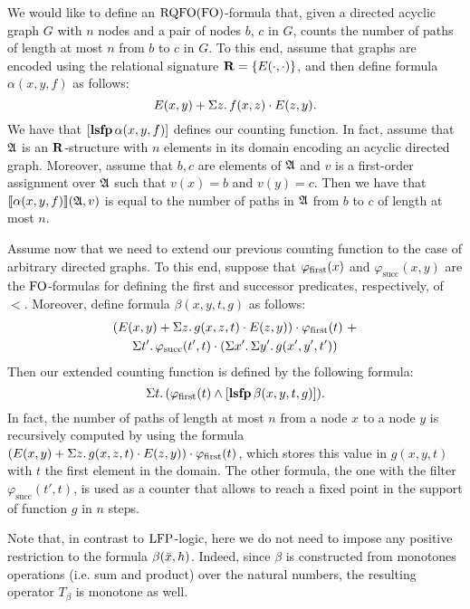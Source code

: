 \begin{example} \label{ex:count-path}
We would like to define an ${\rm RQFO}({\rm FO})$-formula that, given a directed acyclic graph $G$ with $n$ nodes and a pair of nodes $b$, $c$ in $G$, counts the number of paths of length at most $n$ from $b$ to $c$ in $G$. To this end, assume that graphs are encoded using the relational signature $\mathbf{R} = \{ E(\cdot,\cdot) \}$, and then define formula $\alpha(x, y, f)$ as follows:
$$
E(x,y) + \Sigma{z}.\, f(x,z)\cdot E(z,y).
$$
We have that $[{\bf lsfp} \, \alpha(x,y,f)]$ defines our counting function. In fact, assume that $\mathfrak{A}$ is an $\mathbf{R}$-structure with $n$ elements in its domain encoding an acyclic directed graph. Moreover, assume that $b,c$ are elements of $\mathfrak{A}$ and $v$ is a first-order assignment over $\mathfrak{A}$ such that $v(x) = b$ and $v(y) = c$. Then we have that ${\llbracket{}{\alpha(x,y,f)}\rrbracket}(\mathfrak{A},v)$ is equal to the  number of paths in $\mathfrak{A}$ from $b$ to $c$ of length at most $n$.

Assume now that we need to extend our previous counting function to the case of arbitrary directed graphs. To this end, suppose that $\varphi_{\text{\rm first}}(x)$ and $\varphi_{\text{succ}}(x,y)$ are the ${\rm FO}$-formulas for defining the first and successor predicates, respectively, of $<$. Moreover, define formula $\beta(x, y, t, g)$ as follows:
\begin{multline*}
(E(x,y) + \Sigma{z}.\, g(x,z,t)\cdot E(z,y)) \cdot \varphi_{\text{\rm first}}(t) \ +\\
\Sigma{t'}.\, \varphi_{\text{succ}}(t',t) \cdot \left(\Sigma{x'}.\, \Sigma{y'}.\, g(x',y',t') \right)
\end{multline*}
Then our extended counting function is defined by the following formula:
$$
\Sigma{t}.\, (\varphi_{\text{\rm first}}(t) \wedge [{\bf lsfp} \, \beta(x,y,t,g)]).
$$ 
In fact, the number of paths of length at most $n$ from a node $x$ to a node $y$ is recursively computed by using the formula $(E(x,y) + \Sigma{z}.\, g(x,z,t)\cdot E(z,y)) \cdot \varphi_{\text{\rm first}}(t)$, which stores this value in $g(x,y,t)$ with $t$ the first element in the domain.  The other formula, the one with the filter $\varphi_{\text{succ}}(t',t)$, is used as a counter that allows to reach a fixed point in the support of function $g$ in $n$ steps.
\end{example}
%
%
Note that, in contrast to ${\rm LFP}$-logic, here we do not need to impose any positive restriction to the formula $\beta(\bar{x},h)$.
Indeed, since $\beta$ is constructed from monotones operations (i.e. sum and product) over the natural numbers, the resulting operator $T_{\beta}$ is monotone as well.

